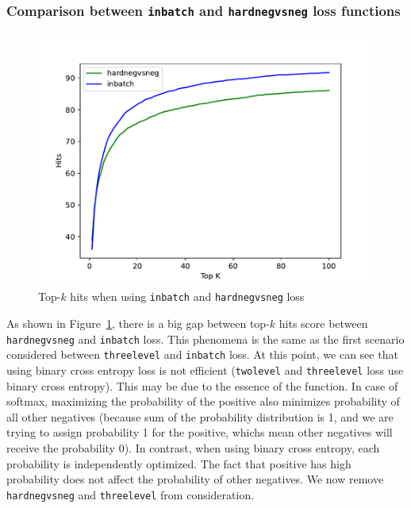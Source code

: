 \documentclass[12pt, sort&compress]{report}
\begin{document}
\subsubsection{Comparison between {\tt inbatch} and {\tt hardnegvsneg} loss functions}
\label{sec:4.4.1.3}
\begin{figure}[!htbp]
	\centering
	\includegraphics[scale=.7]{images/PDF/experiments/inbatch_hardnegvsneg_4-1-3.pdf}
	\caption{Top-$k$ hits when using {\tt inbatch} and {\tt hardnegvsneg} loss}
	\label{fig:14}
\end{figure}
As shown in Figure~\ref{fig:14}, there is a big gap between top-$k$ hits score between {\tt hardnegvsneg} and {\tt inbatch} loss. This phenomena is the same as the first scenario considered between {\tt threelevel} and {\tt inbatch} loss. At this point, we can see that using binary cross entropy loss is not efficient ({\tt twolevel} and {\tt threelevel} loss use binary cross entropy). This may be due to the essence of the function. In case of softmax, maximizing the probability of the positive also minimizes probability of all other negatives (because sum of the probability distribution is 1, and we are trying to assign probability 1 for the positive, whichs mean other negatives will receive the probability 0). In contrast, when using binary cross entropy, each probability is independently optimized. The fact that positive has high probability does not affect the probability of other negatives. We now remove {\tt hardnegvsneg} and {\tt threelevel} from consideration.
\end{document}
